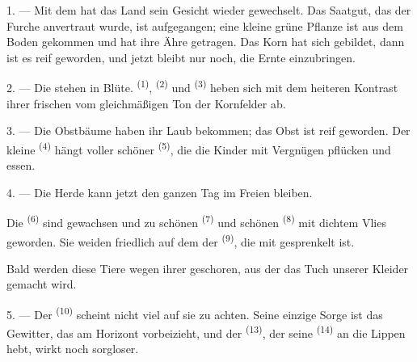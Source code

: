 
\VUsaut{5.0mm}
\VUsaut{3.0mm}
\VUsaut{3.0mm}
\VUsaut{4.0mm}
\VUsaut{3.0mm}

1. --- Mit dem  hat das Land sein Gesicht wieder gewechselt. Das
Saatgut, das der Furche anvertraut wurde, ist aufgegangen; eine kleine grüne
Pflanze ist aus dem Boden gekommen und hat ihre Ähre getragen. Das Korn hat sich
gebildet, dann ist es reif geworden, und jetzt bleibt nur noch, die Ernte
einzubringen.

2. --- Die  stehen in Blüte. 
\textsuperscript{(1)},  \textsuperscript{(2)} und
 \textsuperscript{(3)} heben sich mit dem heiteren Kontrast ihrer
frischen  vom gleichmäßigen Ton der Kornfelder ab.

3. --- Die Obstbäume haben ihr Laub bekommen; das Obst ist reif geworden. Der kleine
 \textsuperscript{(4)} hängt voller schöner 
\textsuperscript{(5)}, die die Kinder mit Vergnügen pflücken und essen.

4. --- Die Herde kann jetzt den ganzen Tag im Freien bleiben.

Die  \textsuperscript{(6)} sind gewachsen und zu schönen
 \textsuperscript{(7)} und schönen 
\textsuperscript{(8)} mit dichtem Vlies geworden. Sie weiden friedlich auf dem
 der  \textsuperscript{(9)}, die mit 
gesprenkelt ist.

Bald werden diese Tiere wegen ihrer  geschoren, aus der das Tuch
unserer Kleider gemacht wird.

\VUsaut{5.0mm}
\VUsaut{3.4mm}

5. --- Der  \textsuperscript{(10)} scheint nicht viel auf sie zu achten.
Seine einzige Sorge ist das Gewitter, das am Horizont vorbeizieht, und der
 \textsuperscript{(13)}, der seine 
\textsuperscript{(14)} an die Lippen hebt, wirkt noch sorgloser.

